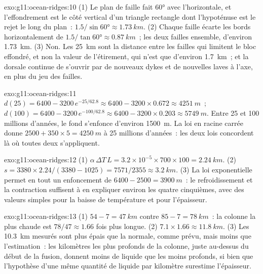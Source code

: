 \begin{solution}{exo:g11:ocean-ridges:10}
(1) Le plan de faille fait \ang{60} avec l'horizontale, et l'effondrement est
le côté vertical d'un triangle rectangle dont l'hypoténuse est le rejet le
long du plan~: $1.5/\sin\ang{60} \approx \qty{1.73}{km}$. (2) Chaque faille
écarte les bords horizontalement de $1.5/\tan\ang{60} \approx \qty{0.87}{km}$~; les deux failles ensemble, d'environ \qty{1.73}{km}.
(3) Non. Les \qty{25}{km} sont la distance entre les failles qui limitent
le bloc effondré, et non la valeur de l'étirement, qui n'est que d'environ
\qty{1.7}{km}~; et la dorsale continue de s'ouvrir par de nouveaux dykes et
de nouvelles laves à l'axe, en plus du jeu des failles.
\end{solution}

\begin{solution}{exo:g11:ocean-ridges:11}
$d(25) = 6400 - 3200\,e^{-25/62.8} \approx 6400 - 3200 \times 0.672 \approx
\qty{4251}{m}$~; $d(100) = 6400 - 3200\,e^{-100/62.8} \approx 6400 - 3200
\times 0.203 \approx \qty{5749}{m}$. Entre 25 et 100 millions d'années, le
fond s'enfonce d'environ \qty{1500}{m}. La loi en racine carrée donne
$2500 + 350 \times 5 = \qty{4250}{m}$ à 25 millions d'années~: les deux
lois concordent là où toutes deux s'appliquent.
\end{solution}

\begin{solution}{exo:g11:ocean-ridges:12}
(1) $\alpha\,\Delta T\,L = 3.2 \times 10^{-5} \times 700 \times 100 =
\qty{2.24}{km}$. (2) $s = 3380 \times 2.24/(3380 - 1025) = 7571/2355 \approx
\qty{3.2}{km}$. (3) La loi exponentielle permet en tout un enfoncement de
$6400 - 2500 =
\qty{3900}{m}$~: le refroidissement et la contraction suffisent à en
expliquer environ les quatre cinquièmes, avec des valeurs simples pour la
baisse de température et pour l'épaisseur.
\end{solution}

\begin{solution}{exo:g11:ocean-ridges:13}
(1) $54 - 7 = \qty{47}{km}$ contre $85 - 7 = \qty{78}{km}$~: la colonne la
plus chaude est $78/47 \approx 1.66$ fois plus longue. (2) $7.1 \times 1.66 \approx
\qty{11.8}{km}$. (3) Les \qty{10.3}{km} mesurés sont plus épais que la
normale, comme prévu, mais moins que l'estimation~: les kilomètres les plus
profonds de la colonne, juste au-dessus du début de la fusion, donnent moins
de liquide que les moins profonds, si bien que l'hypothèse d'une même
quantité de liquide par kilomètre surestime l'épaisseur.
\end{solution}

